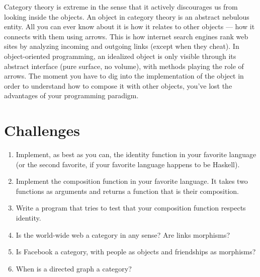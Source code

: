 Category theory is extreme in the sense that it actively discourages us
from looking inside the objects. An object in category theory is an
abstract nebulous entity. All you can ever know about it is how it
relates to other objects --- how it connects with them using arrows. This
is how internet search engines rank web sites by analyzing incoming and
outgoing links (except when they cheat). In object-oriented programming,
an idealized object is only visible through its abstract interface (pure
surface, no volume), with methods playing the role of arrows. The moment
you have to dig into the implementation of the object in order to
understand how to compose it with other objects, you've lost the
advantages of your programming paradigm.

\section{Challenges}

\begin{enumerate}
\tightlist
\item
  Implement, as best as you can, the identity function in your favorite
  language (or the second favorite, if your favorite language happens to
  be Haskell).
\item
  Implement the composition function in your favorite language. It takes
  two functions as arguments and returns a function that is their
  composition.
\item
  Write a program that tries to test that your composition function
  respects identity.
\item
  Is the world-wide web a category in any sense? Are links morphisms?
\item
  Is Facebook a category, with people as objects and friendships as
  morphisms?
\item
  When is a directed graph a category?
\end{enumerate}

